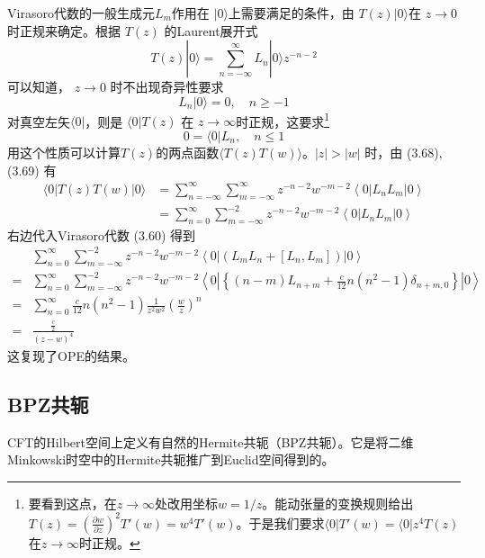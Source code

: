Virasoro代数的一般生成元$ L_m $作用在 $|0\rangle $上需要满足的条件，由 $T(z)|0\rangle $在 $z\to 0 $时正规来确定。根据 $T(z)$ 的Laurent展开式
\begin{equation}
	T(z)|0\rangle=\sum_{n=-\infty}^{\infty} L_{n}|0\rangle z^{-n-2}
\end{equation}
可以知道， $z\to 0$ 时不出现奇异性要求
\begin{equation}
	L_{n}|0\rangle=0, \quad n \geq-1
\end{equation}
对真空左矢$ \langle 0| $，则是 $\langle 0|T(z)$ 在 $z\to \infty $时正规，这要求\footnote{要看到这点，在$z \to \infty$处改用坐标$w = 1/z$。能动张量的变换规则给出$T(z) = \left( \frac{\partial w}{\partial z} \right)^2 T'(w)=w^4 T'(w)$。于是我们要求$\langle 0 | T'(w) = \langle 0 | z^4 T(z)$在$z \to \infty$时正规。}
\begin{equation}
	0=\langle 0| L_{n}, \quad n \leq 1
\end{equation}
用这个性质可以计算$ T(z) $的两点函数$ \langle T(z)T(w)\rangle $。$ |z|>|w|$ 时，由 (3.68),(3.69) 有
\begin{equation*}
	\begin{aligned} \langle 0|T(z) T(w)| 0\rangle &=\sum_{n=-\infty}^{\infty} \sum_{m=-\infty}^{\infty} z^{-n-2} w^{-m-2}\left\langle 0\left|L_{n} L_{m}\right| 0\right\rangle \\ &=\sum_{n=0}^{\infty} \sum_{m=-\infty}^{-2} z^{-n-2} w^{-m-2}\left\langle 0\left|L_{n} L_{m}\right| 0\right\rangle \end{aligned}
\end{equation*}
右边代入Virasoro代数 (3.60) 得到
\begin{equation*}
\begin{aligned} & \sum_{n=0}^{\infty} \sum_{m=-\infty}^{-2} z^{-n-2} w^{-m-2}\left\langle 0\left|\left(L_{m} L_{n}+\left[L_{n}, L_{m}\right]\right)\right| 0\right\rangle \\ =& \sum_{n=0}^{\infty} \sum_{m=-\infty}^{-2} z^{-n-2} w^{-m-2}\left\langle 0\left|\left\{(n-m) L_{n+m}+\frac{c}{12} n\left(n^{2}-1\right) \delta_{n+m, 0}\right\}\right| 0\right\rangle \\ =& \sum_{n=0}^{\infty} \frac{c}{12} n\left(n^{2}-1\right) \frac{1}{z^{2} w^{2}}\left(\frac{w}{z}\right)^{n} \\ =& \frac{\frac{c}{2}}{(z-w)^{4}} \end{aligned}
\end{equation*}
这复现了OPE的结果。

\subsection{BPZ共轭}
CFT的Hilbert空间上定义有自然的Hermite共轭（BPZ共轭）。它是将二维Minkowski时空中的Hermite共轭推广到Euclid空间得到的。

